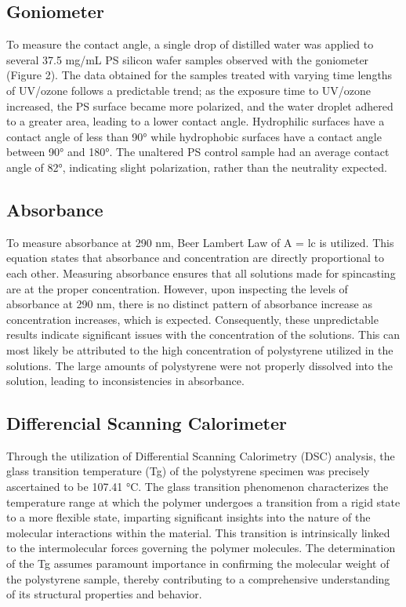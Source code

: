 \documentclass{article}
\begin{document}
\begin{multicols}{2}
            \subsection{Goniometer}
                To measure the contact angle, a single drop of distilled water was applied to several 37.5 mg/mL PS silicon wafer samples observed with the goniometer (Figure 2). The data obtained for the samples treated with varying time lengths of UV/ozone follows a predictable trend; as the exposure time to UV/ozone increased, the PS surface became more polarized, and the water droplet adhered to a greater area, leading to a lower contact angle. Hydrophilic surfaces have a contact angle of less than 90° while hydrophobic surfaces have a contact angle between 90° and 180°. The unaltered PS control sample had an average contact angle of 82°, indicating slight polarization, rather than the neutrality expected.
            
            \subsection{Absorbance}
                To measure absorbance at 290 nm, Beer Lambert Law of A = lc is utilized. This equation states that absorbance and concentration are directly proportional to each other. Measuring absorbance ensures that all solutions made for spincasting are at the proper concentration. However, upon inspecting the levels of absorbance at 290 nm, there is no distinct pattern of absorbance increase as concentration increases, which is expected. Consequently, these unpredictable results indicate significant issues with the concentration of the solutions. This can most likely be attributed to the high concentration of polystyrene utilized in the solutions. The large amounts of  polystyrene were not properly dissolved into the solution, leading to inconsistencies in absorbance. 

            \subsection{Differencial Scanning Calorimeter}
                Through the utilization of Differential Scanning Calorimetry (DSC) analysis, the glass transition temperature (Tg) of the polystyrene specimen was precisely ascertained to be 107.41 °C. The glass transition phenomenon characterizes the temperature range at which the polymer undergoes a transition from a rigid state to a more flexible state, imparting significant insights into the nature of the molecular interactions within the material. This transition is intrinsically linked to the intermolecular forces governing the polymer molecules\autocite{WOS:COUCHMAN}. The determination of the Tg assumes paramount importance in confirming the molecular weight of the polystyrene sample, thereby contributing to a comprehensive understanding of its structural properties and behavior.

\end{multicols}
\end{document}
